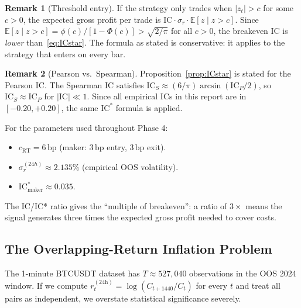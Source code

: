 \documentclass[12pt, a4paper]{article}
\theoremstyle{plain}
\theoremstyle{definition}
\newtheorem{remark}{Remark}[section]
\newcommand{\IC}{\mathrm{IC}}
\newcommand{\E}{\mathbb{E}}
\newcommand{\bp}{\,\mathrm{bp}}
\begin{document}
\begin{remark}[Threshold entry]
  If the strategy only trades when $|z_t| > c$ for some $c > 0$, the expected
  gross profit per trade is $\IC \cdot \sigma_r \cdot \E[z \mid z > c]$.  Since
  $\E[z \mid z > c] = \phi(c)/[1-\Phi(c)] > \sqrt{2/\pi}$ for all $c > 0$,
  the breakeven IC is \emph{lower} than~\eqref{eq:ICstar}.  The formula as
  stated is conservative: it applies to the strategy that enters on every bar.
\end{remark}

\begin{remark}[Pearson vs.\ Spearman]
  Proposition~\ref{prop:ICstar} is stated for the Pearson IC.  The Spearman
  IC satisfies $\IC_S \approx (6/\pi)\arcsin(\IC_P / 2)$, so
  $\IC_S \approx \IC_P$ for $|\IC| \ll 1$.  Since all empirical ICs in this
  report are in $[-0.20, +0.20]$, the same $\IC^*$ formula is applied.
\end{remark}

For the parameters used throughout Phase 4:
\begin{itemize}[noitemsep]
  \item $c_{\mathrm{RT}} = 6\bp$ (maker: $3\bp$ entry, $3\bp$ exit).
  \item $\sigma_r^{(24h)} \approx 2.135\%$ (empirical OOS volatility).
  \item $\IC^*_{\mathrm{maker}} \approx 0.035$.
\end{itemize}

The IC/IC* ratio gives the ``multiple of breakeven'': a ratio of $3\times$
means the signal generates three times the expected gross profit needed
to cover costs.

\subsection{The Overlapping-Return Inflation Problem}
\label{sec:overlap}

The 1-minute BTCUSDT dataset has $T \approx 527{,}040$ observations in the OOS
2024 window.  If we compute $r_t^{(24\text{h})} = \log(C_{t+1440}/C_t)$
for every $t$ and treat all pairs as independent, we overstate statistical
significance severely.
\end{document}
